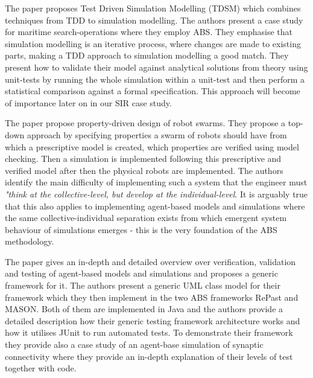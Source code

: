 The paper \cite{onggo_test-driven_2016} proposes Test Driven Simulation Modelling (TDSM) which combines techniques from TDD to simulation modelling. The authors present a case study for maritime search-operations where they employ ABS. They emphasise that simulation modelling is an iterative process, where changes are made to existing parts, making a TDD approach to simulation modelling a good match. They present how to validate their model against analytical solutions from theory using unit-tests by running the whole simulation within a unit-test and then perform a statistical comparison against a formal specification. This approach will become of importance later on in our SIR case study.

The paper \cite{brambilla_property-driven_2012} propose property-driven design of robot swarms. They propose a top-down approach by specifying properties a swarm of robots should have from which a prescriptive model is created, which properties are verified using model checking. Then a simulation is implemented following this prescriptive and verified model after then the physical robots are implemented. The authors identify the main difficulty of implementing such a system that the engineer must \textit{"think at the collective-level, but develop at the individual-level}. It is arguably true that this also applies to implementing agent-based models and simulations where the same collective-individual separation exists from which emergent system behaviour of simulations emerges - this is the very foundation of the ABS methodology.

The paper \cite{gurcan_generic_2013} gives an in-depth and detailed overview over verification, validation and testing of agent-based models and simulations and proposes a generic framework for it. The authors present a generic UML class model for their framework which they then implement in the two ABS frameworks RePast and MASON. Both of them are implemented in Java and the authors provide a detailed description how their generic testing framework architecture works and how it utilises JUnit to run automated tests. To demonstrate their framework they provide also a case study of an agent-base simulation of synaptic connectivity where they provide an in-depth explanation of their levels of test together with code.

